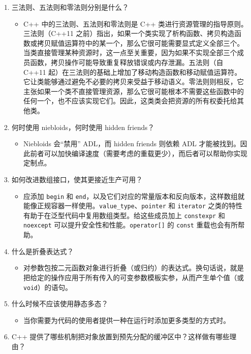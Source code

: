 \begin{enumerate}
\item 三法则、五法则和零法则分别是什么？

\begin{itemize}
\item C++ 中的三法则、五法则和零法则是 C++ 类进行资源管理的指导原则。三法则（C++11 之前）指出，如果一个类实现了析构函数、拷贝构造函数或拷贝赋值运算符中的某一个，那么它很可能需要显式定义全部三个。当类直接管理某种资源时，这一点至关重要，因为如果不实现全部三个成员函数，拷贝操作可能导致重复释放错误或内存泄漏。五法则（自 C++11 起）在三法则的基础上增加了移动构造函数和移动赋值运算符。它让类能够通过避免不必要的拷贝来受益于移动语义。零法则则相反，它主张如果一个类不直接管理资源，那么它很可能根本不需要这些函数中的任何一个，也不应该实现它们。因此，这类类会把资源的所有权委托给其他类。
\end{itemize}
\item 何时使用 niebloids，何时使用 hidden friends？

\begin{itemize}
\item Niebloids 会“禁用” ADL，而 hidden friends 则依赖 ADL 才能被找到。因此前者可以加快编译速度（需要考虑的重载更少），而后者可以帮助你实现定制点。
\end{itemize}
\item 如何改进数组接口，使其更接近生产可用？

\begin{itemize}
\item 应添加 \texttt{begin} 和 \texttt{end}，以及它们对应的常量版本和反向版本，这样数组就能像正规容器一样使用。\texttt{value\_\allowbreak{}type}、\texttt{pointer} 和 \texttt{iterator} 之类的特性有助于在泛型代码中复用数组类型。给这些成员加上 \texttt{constexpr} 和 \texttt{noexcept} 可以提升安全性和性能。\texttt{operator[]} 的 \texttt{const} 重载也会有所帮助。
\end{itemize}
\item 什么是折叠表达式？

\begin{itemize}
\item 对参数包按二元函数对象进行折叠（或归约）的表达式。换句话说，就是把给定的操作应用于所有传入的可变参数模板实参，从而产生单个值（或 \texttt{void}）的语句。
\end{itemize}
\item 什么时候不应该使用静态多态？

\begin{itemize}
\item 当你需要为代码的使用者提供一种在运行时添加更多类型的方式时。
\end{itemize}
\item C++ 提供了哪些机制把对象放置到预先分配的缓冲区中？这样做有哪些理由？


\end{enumerate}
